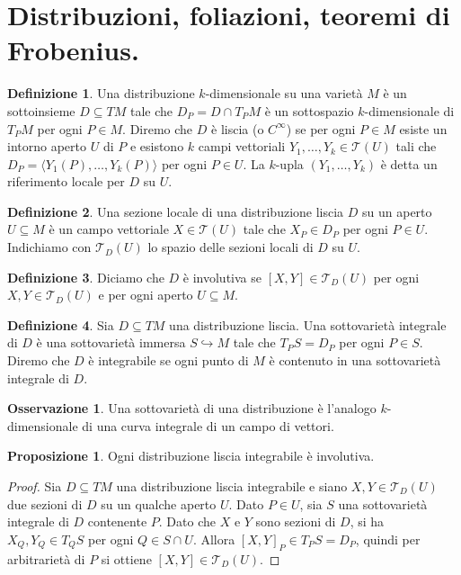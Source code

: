 \documentclass[a4paper,11pt]{article}
\theoremstyle{definition}
\newtheorem{osservazione}{Osservazione}[section]
\newtheorem{definizione}{Definizione}[section]
\theoremstyle{theorem}
\newtheorem{proposizione}{Proposizione}[section]
\begin{document}
\section{Distribuzioni, foliazioni, teoremi di Frobenius.}
\begin{definizione}
	Una distribuzione $k$-dimensionale su una varietà $M$ è un sottoinsieme $D\subseteq TM$ tale che $D_P=D\cap T_PM$ è un sottospazio $k$-dimensionale di $T_PM$ per ogni $P\in M$. Diremo che $D$ è liscia (o $C^\infty$) se per ogni $P\in M$ esiste un intorno aperto $U$ di $P$ e esistono $k$ campi vettoriali $Y_1,\dots,Y_k\in\mathcal{T}(U)$ tali che $D_P=\langle Y_1(P),\dots,Y_k(P)\rangle$ per ogni $P\in U$. La $k$-upla $(Y_1,\dots,Y_k)$ è detta un riferimento locale per $D$ su $U$.
\end{definizione}
\begin{definizione}
	Una sezione locale di una distribuzione liscia $D$ su un aperto $U\subseteq M$ è un campo vettoriale $X\in\mathcal{T}(U)$ tale che $X_P\in D_P$ per ogni $P\in U$. Indichiamo con $\mathcal{T}_D(U)$ lo spazio delle sezioni locali di $D$ su $U$.
\end{definizione}
\begin{definizione}
	Diciamo che $D$ è involutiva se $[X,Y]\in\mathcal{T}_D(U)$ per ogni $X,Y\in\mathcal{T}_D(U)$ e per ogni aperto $U\subseteq M$.
\end{definizione}
\begin{definizione}
	Sia $D\subseteq TM$ una distribuzione liscia. Una sottovarietà integrale di $D$ è una sottovarietà immersa $S\hookrightarrow M$ tale che $T_PS=D_P$ per ogni $P\in S$. Diremo che $D$ è integrabile se ogni punto di $M$ è contenuto in una sottovarietà integrale di $D$.
\end{definizione}
\begin{osservazione}
	Una sottovarietà di una distribuzione è l'analogo $k$-dimensionale di una curva integrale di un campo di vettori.
\end{osservazione}
\begin{proposizione}
	Ogni distribuzione liscia integrabile è involutiva.
\end{proposizione}
\begin{proof}
	Sia $D\subseteq TM$ una distribuzione liscia integrabile e siano $X,Y\in\mathcal{T}_D(U)$ due sezioni di $D$ su un qualche aperto $U$. Dato $P\in U$, sia $S$ una sottovarietà integrale di $D$ contenente $P$. Dato che $X$ e $Y$ sono sezioni di $D$, si ha $X_Q,Y_Q\in T_QS$ per ogni $Q\in S\cap U$. Allora $[X,Y]_P\in T_PS=D_P$, quindi per arbitrarietà di $P$ si ottiene $[X,Y]\in\mathcal{T}_D(U)$.
\end{proof}
\end{document}
